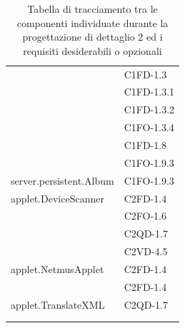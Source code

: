 \begin{footnotesize}
\begin{longtable}[!h]{|l|l|}
& C1FD-1.3\\
& C1FD-1.3.1\\
& C1FD-1.3.2\\
& C1FO-1.3.4\\
& C1FD-1.8\\
& C1FO-1.9.3\\\hline 
server.persistent.Album  &  C1FO-1.9.3\\\hline 
applet.DeviceScanner  &  C2FD-1.4\\
& C2FO-1.6\\
& C2QD-1.7\\
& C2VD-4.5\\\hline
applet.NetmusApplet  &  C2FD-1.4 \\
& C2FD-1.4\\\hline
applet.TranslateXML  &  C2QD-1.7\\
& \\\hline
\caption{Tabella di tracciamento tra le componenti individuate durante la
progettazione di dettaglio 2 ed i requisiti desiderabili o opzionali}
\end{longtable}
\end{footnotesize}


